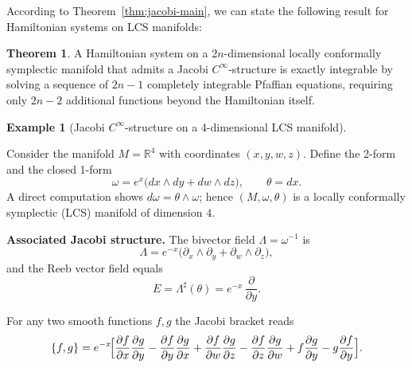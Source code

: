 \documentclass{article}
\theoremstyle{remark}
\theoremstyle{definition}
\newtheorem{theorem}{Theorem}[section]
\newtheorem{example}{Example}[section]
\begin{document}
According to Theorem~\ref{thm:jacobi-main}, we can state the following result for Hamiltonian systems on LCS manifolds:
\begin{theorem}\label{LCSC}
A Hamiltonian system on a 2$n$-dimensional locally conformally symplectic manifold that admits a Jacobi $C^\infty$-structure is exactly integrable by solving a
sequence of $2n-1$ completely integrable Pfaffian equations, requiring only $2n-2$ additional functions beyond the Hamiltonian itself.
\end{theorem}

\begin{example}[Jacobi $C^\infty$-structure on a 4-dimensional LCS manifold]
\label{ex:LCS-Jacobi-Cinf}

Consider the manifold $M = \mathbb{R}^4$ with coordinates $(x, y, w, z)$.
Define the 2-form and the closed 1-form
\[
\omega = e^{x}\big( dx \wedge dy + dw \wedge dz \big), \qquad 
\theta = dx .
\]
A direct computation shows $d\omega = \theta \wedge \omega$; hence $(M,\omega,\theta)$ is a locally conformally symplectic (LCS) manifold of dimension $4$.

\medskip\noindent
\textbf{Associated Jacobi structure.}
The bivector field $\Lambda = \omega^{-1}$ is
\[
\Lambda = e^{-x}\big( \partial_x \wedge \partial_y + \partial_w \wedge \partial_z \big),
\]
and the Reeb vector field equals
\[
E = \Lambda^\sharp(\theta) = e^{-x}\,\frac{\partial}{\partial y}.
\]


For any two smooth functions $f,g$ the Jacobi bracket reads
\begin{equation}\label{eq:Jacobi-bracket-ex}
\{f,g\}=e^{-x}\!\Bigl[
\frac{\partial f}{\partial x}\frac{\partial g}{\partial y}
-\frac{\partial f}{\partial y}\frac{\partial g}{\partial x}
+\frac{\partial f}{\partial w}\frac{\partial g}{\partial z}
-\frac{\partial f}{\partial z}\frac{\partial g}{\partial w}
+f\frac{\partial g}{\partial y}-g\frac{\partial f}{\partial y}\Bigr].
\end{equation}




\end{example}
\end{document}
